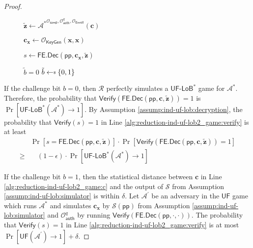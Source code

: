 \begin{proof}
\begin{figure}[h]
\begin{minipage}[t]{0.5\linewidth}
\begin{algorithm}[H]
\begin{algorithmic}[1]
		\State ${\mathbf{\tilde{z}}} \gets {\mathcal{A}^*}^{\mathcal{O}_{\textsf{samp}}, \mathcal{O}_\textsf{auth}^q, \mathcal{O}_{\textsf{Enroll}}} ( \mathbf{c})$

		\State $\mathbf{c_x} \gets \mathcal{O}_{\textsf{KeyGen}}(\mathbf{x}, \mathbf{x})$

		\State $s \gets \textsf{FE.Dec}( \textsf{pp}, \mathbf{c_x}, \mathbf{\tilde{z}} )$

		 \label{alg:reduction-ind-uf-lob2_game:verify}
			\State \Return $\tilde{b} = 0$
		\Else
			\State \Return $\tilde{b} \getsdollar \{0, 1\}$
		\EndIf

	\end{algorithmic}
	\end{algorithm}
	\end{minipage}
	
\label{fig:reduction-ind-uf-lob2_game}
\end{figure}

If the challenge bit $b = 0$, then $\mathcal{R}$ perfectly simulates a $\textsf{UF-LoB}^*$ game for $\mathcal{A}^*$. Therefore, the probability that $\textsf{Verify}(\textsf{FE.Dec}(\textsf{pp}, \mathbf{c}, \mathbf{\tilde{z}})) = 1$ is $\Pr[\textsf{UF-LoB}^*(\mathcal{A}^*) \to 1]$. By Assumption \ref{assump:ind-uf-lob:decryption}, the probability that $\textsf{Verify}(s) = 1$ in Line \ref{alg:reduction-ind-uf-lob2_game:verify} is at least
\begin{align*}
	& \Pr \left[ s = \textsf{FE.Dec}(\textsf{pp}, \mathbf{c}, \mathbf{\tilde{z}}) \right]  \cdot \Pr \left[ \textsf{Verify}(\textsf{FE.Dec}(\textsf{pp}, \mathbf{c}, \mathbf{\tilde{z}})) = 1 \right] \\
	\geq & \quad (1 - \epsilon) \cdot \Pr[\textsf{UF-LoB}^*(\mathcal{A}^*) \to 1]
\end{align*}

	If the challenge bit $b = 1$, then the statistical distance between $\mathbf{c}$ in Line \ref{alg:reduction-ind-uf-lob2_game:c} and the output of $\mathcal{S}$ from Assumption \ref{assump:ind-uf-lob:simulator} is within $\delta$. Let $\mathcal{A}^\prime$ be an adversary in the $\textsf{UF}$ game which runs $\mathcal{A}^*$ and simulates $\mathbf{c_x}$ by $\mathcal{S}(\textsf{pp})$ from Assumption \ref{assump:ind-uf-lob:simulator} and $\mathcal{O}_{\textsf{auth}}^q$ by running $\textsf{Verify}(\textsf{FE.Dec}(\textsf{pp}, \cdot, \cdot))$. The probability that $\textsf{Verify}(s) = 1$ in Line \ref{alg:reduction-ind-uf-lob2_game:verify} is at most $\Pr[\textsf{UF}(\mathcal{A}^\prime) \to 1] + \delta$.



\end{proof}
